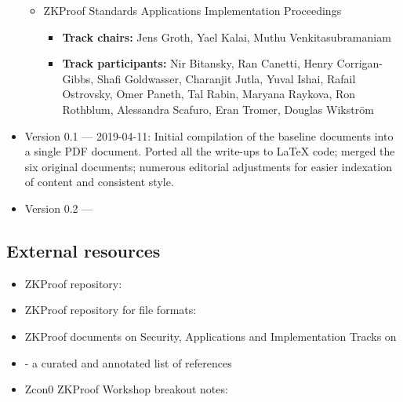 \begin{itemize}
\begin{itemize}
		
	\item ZKProof Standards Applications Implementation Proceedings
			\begin{itemize}
			\item \textbf{Track chairs:} 
			Jens Groth, Yael Kalai, Muthu Venkitasubramaniam	
			
			\item \textbf{Track participants:} 
			Nir Bitansky, Ran Canetti, Henry Corrigan-Gibbs, Shafi Goldwasser, Charanjit Jutla, Yuval Ishai, Rafail Ostrovsky, Omer Paneth, Tal Rabin, Maryana Raykova, Ron Rothblum, Alessandra Scafuro, Eran Tromer, Douglas Wikström 
			
			\end{itemize}

	\end{itemize}
	
	

\item Version 0.1 --- 2019-04-11: 
	Initial compilation of the baseline documents into a single PDF document.
	Ported all the write-ups to LaTeX code; merged the six original documents; 
numerous editorial adjustments for easier indexation of content and consistent style.

\item Version 0.2 --- 

\end{itemize}




\subsection*{External resources} %
\label{prelim:external-resources}

\begin{itemize}[topsep=0pt]
	\item ZKProof repository: 
	\item ZKProof repository for file formats: 
	\item ZKProof documents on Security, Applications and Implementation Tracks on\\ 
				\sloppy\mbox{}
	\item {} - a curated and annotated list of references
	\item Zcon0 ZKProof Workshop breakout notes: 
\end{itemize}
